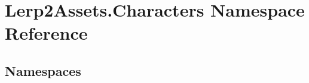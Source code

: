 \hypertarget{namespace_lerp2_assets_1_1_characters}{}\section{Lerp2\+Assets.\+Characters Namespace Reference}
\label{namespace_lerp2_assets_1_1_characters}
\subsection*{Namespaces}
\begin{DoxyCompactItemize}
\end{DoxyCompactItemize}
